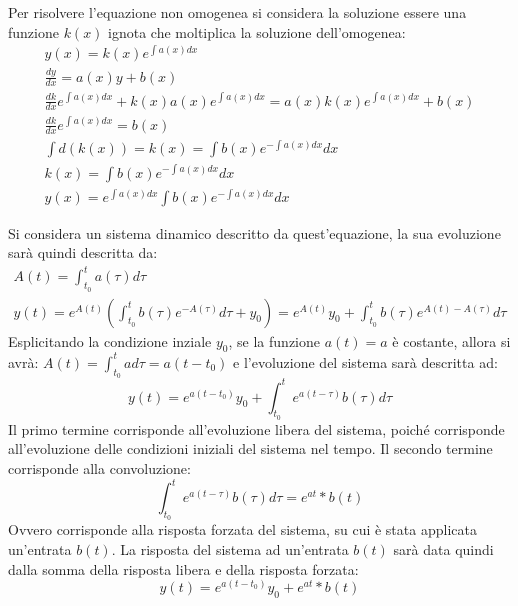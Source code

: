 \documentclass{article}
\numberwithin{equation}{subsection}
\begin{document}
Per risolvere l'equazione non omogenea si considera la soluzione essere una funzione $k(x)$ ignota che moltiplica la soluzione dell'omogenea:
\begin{gather}
    y(x)=k(x)e^{\int a(x)dx}\\
    \displaystyle\frac{dy}{dx}=a(x)y+b(x)\\
    \displaystyle\frac{dk}{dx}e^{\int a(x)dx}+k(x) a(x)e^{\int a(x)dx}=a(x)k(x)e^{\int a(x)dx}+b(x)\\
    \displaystyle\frac{dk}{dx}e^{\int a(x)dx}=b(x)\\
    \displaystyle\int d(k(x))=k(x)=\int b(x)e^{-\int a(x)dx}dx\\
    k(x)=\displaystyle\int b(x)e^{-\int a(x)dx}dx\\
    y(x)=\displaystyle e^{\int a(x)dx}\int b(x)e^{-\int a(x)dx}dx
\end{gather}

Si considera un sistema dinamico descritto da quest'equazione, la sua evoluzione sarà quindi descritta da:
\begin{gather}
    A(t)=\displaystyle\int_{t_0}^{t}a(\tau)d\tau\\
    y(t)=e^{A(t)}\left(\int_{t_0}^{t} b(\tau)e^{-A(\tau)}d\tau+y_0\right)=e^{A(t)}y_0+\int_{t_0}^{t} b(\tau)e^{A(t)-A(\tau)}d\tau
\end{gather}
Esplicitando la condizione inziale $y_0$, se la funzione $a(t)=a$ è costante, allora si avrà: $\displaystyle A(t)=\int_{t_0}^{t}a d\tau=a(t-t_0)$ e l'evoluzione del sistema 
sarà descritta ad:
\begin{equation}
    y(t)=e^{a(t-t_0)}y_0+\displaystyle\int_{t_0}^{t} e^{a(t-\tau)}b(\tau)d\tau
\end{equation}
Il primo termine corrisponde all'evoluzione libera del sistema, poiché corrisponde all'evoluzione delle condizioni iniziali del sistema nel tempo. Il secondo termine 
corrisponde alla convoluzione: 
\begin{equation}
    \displaystyle\int_{t_0}^{t} e^{a(t-\tau)}b(\tau)d\tau=e^{at}*b(t)
\end{equation}
Ovvero corrisponde alla risposta forzata del sistema, su cui è stata applicata un'entrata $b(t)$. La risposta del sistema ad un'entrata $b(t)$ sarà data quindi dalla somma 
della risposta libera e della risposta forzata:
\begin{equation}
    y(t)=e^{a(t-t_0)}y_0+e^{at}*b(t)
\end{equation}
\end{document}
